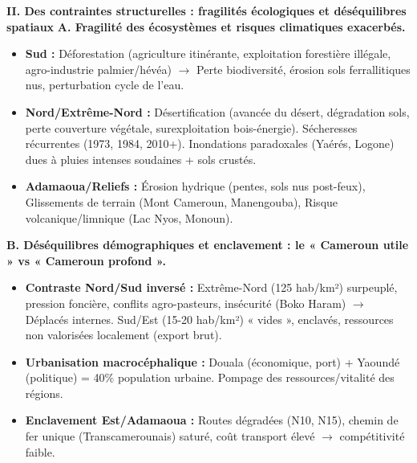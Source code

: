 \documentclass[11pt]{article}
\begin{document}
\begin{exoresolu}
\textbf{II. Des contraintes structurelles : fragilités écologiques et déséquilibres spatiaux}
\textbf{A. Fragilité des écosystèmes et risques climatiques exacerbés.}
\begin{itemize}
    \item \textbf{Sud :} Déforestation (agriculture itinérante, exploitation forestière illégale, agro-industrie palmier/hévéa) $\rightarrow$ Perte biodiversité, érosion sols ferrallitiques nus, perturbation cycle de l'eau.
    \item \textbf{Nord/Extrême-Nord :} Désertification (avancée du désert, dégradation sols, perte couverture végétale, surexploitation bois-énergie). Sécheresses récurrentes (1973, 1984, 2010+). Inondations paradoxales (Yaérés, Logone) dues à pluies intenses soudaines + sols crustés.
    \item \textbf{Adamaoua/Reliefs :} Érosion hydrique (pentes, sols nus post-feux), Glissements de terrain (Mont Cameroun, Manengouba), Risque volcanique/limnique (Lac Nyos, Monoun).
\end{itemize}
\textbf{B. Déséquilibres démographiques et enclavement : le « Cameroun utile » vs « Cameroun profond ».}
\begin{itemize}
    \item \textbf{Contraste Nord/Sud inversé :} Extrême-Nord (125 hab/km²) surpeuplé, pression foncière, conflits agro-pasteurs, insécurité (Boko Haram) $\rightarrow$ Déplacés internes. Sud/Est (15-20 hab/km²) « vides », enclavés, ressources non valorisées localement (export brut).
    \item \textbf{Urbanisation macrocéphalique :} Douala (économique, port) + Yaoundé (politique) = 40\% population urbaine. Pompage des ressources/vitalité des régions.
    \item \textbf{Enclavement Est/Adamaoua :} Routes dégradées (N10, N15), chemin de fer unique (Transcamerounais) saturé, coût transport élevé $\rightarrow$ compétitivité faible.
\end{itemize}


\end{exoresolu}
\end{document}
